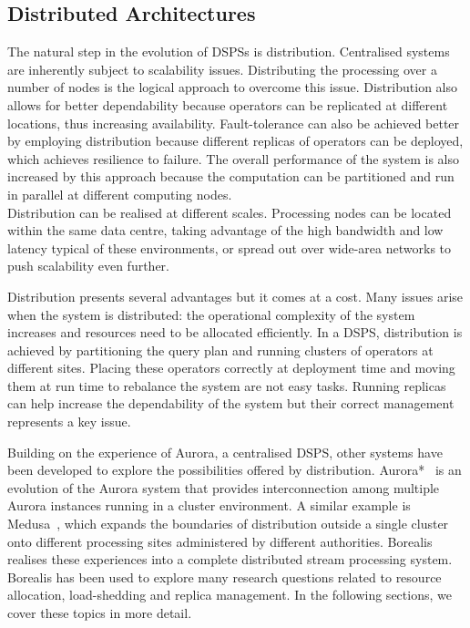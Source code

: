 \subsection*{Distributed Architectures}
The natural step in the evolution of DSPSs is distribution. Centralised systems are inherently subject to
scalability issues. Distributing the processing over a number of nodes is the logical
approach to overcome this issue.
Distribution also allows for better dependability because operators can be replicated at different
locations, thus increasing availability. Fault-tolerance can also be achieved better by employing
distribution because different replicas of operators can be deployed, which achieves resilience to
failure.
The overall performance of the system is also increased by this approach because the computation can be
partitioned and run in parallel at different computing nodes. \\
Distribution can be realised at different scales. Processing nodes can be located within the same data
centre, taking advantage of the high bandwidth and low latency typical of these environments, or spread
out over wide-area networks to push scalability even further.

Distribution presents several advantages but it comes at a cost. Many issues arise when the system
is distributed: the operational complexity of the system increases and resources need to be allocated
efficiently. In a DSPS, distribution is achieved by partitioning the query plan and running clusters of
operators at different sites. Placing these operators correctly at deployment time and moving them at run time to rebalance the
system are not easy tasks. Running replicas can help increase the dependability of
the system but their correct management represents a key issue.

Building on the experience of Aurora, a centralised DSPS, other systems have been developed to explore
the possibilities offered by distribution. Aurora*~\cite{aurora*} is an evolution of the Aurora system
that provides interconnection among multiple Aurora instances running in a cluster environment.
A similar example is Medusa~\cite{aurora-and-medusa}, which expands the boundaries of
distribution outside a single cluster onto different processing sites administered by different
authorities.
Borealis~\cite{borealis-design} realises these experiences into a complete distributed
stream processing system. Borealis has been used to explore many research questions related to resource
allocation, \mbox{load-shedding} and replica management. In the following sections, we cover these
topics in more detail.
\vspace{-10pt}
